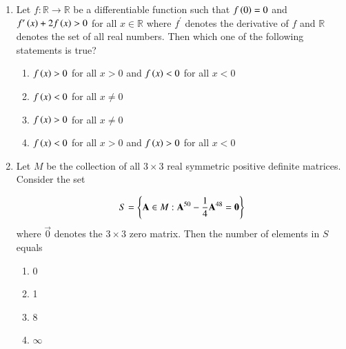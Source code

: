 \documentclass[journal]{IEEEtran}
\begin{document}
\begin{enumerate}
    \item Let $f: \mathbb{R} \to \mathbb{R}$ be a differentiable function such that $f\left(0\right) = 0$ and
    $f^\prime\left(x\right) + 2f\left(x\right) > 0$ for all $x \in \mathbb{R}$ where $f^\prime$ denotes the derivative
    of $f$ and $\mathbb{R}$ denotes the set of all real numbers. Then which one of the following statements
    is true?

    \begin{enumerate}
        \item $f\left(x\right) > 0$ for all $x > 0$ and $f\left(x\right) < 0$ for all $x < 0$
        \item $f\left(x\right) < 0$ for all $x \ne 0$
        \item $f\left(x\right) > 0$ for all $x \ne 0$
        \item $f\left(x\right) < 0$ for all $x > 0$ and $f\left(x\right) > 0$ for all $x < 0$
    \end{enumerate}

    \item Let $M$ be the collection of all $3 \times 3$ real symmetric positive definite matrices.
    Consider the set

    \begin{align*}
        S = \left\{\mathbf{A} \in M : \mathbf{A}^{50} - \frac{1}{4}\mathbf{A}^{48} = \mathbf{0}\right\}
    \end{align*}
    where $\vec{0}$ denotes the $3 \times 3$ zero matrix. Then the number of elements in $S$ equals
    
    \begin{multicols}{4}
    \begin{enumerate}
        \item 0
        \item 1
        \item 8
        \item $\infty$
    \end{enumerate}
    \end{multicols}
\end{enumerate}
\end{document}
